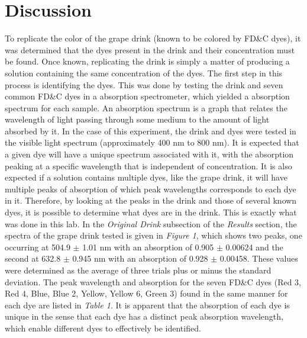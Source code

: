 \documentclass[12pt]{article}
\begin{document}
\section{Discussion}\doublespacing
To replicate the color of the grape drink (known to be colored by FD\&C dyes), it was determined that the dyes present in the drink and their concentration must be found. Once known, replicating the drink is simply a matter of producing a solution containing the same concentration of the dyes. The first step in this process is identifying the dyes. This was done by testing the drink and seven common FD\&C dyes in a absorption spectrometer, which yielded a absorption spectrum for each sample. An absorption spectrum is a graph that relates the wavelength of light passing through some medium to the amount of light absorbed by it. In the case of this experiment, the drink and dyes were tested in the visible light spectrum (approximately 400 nm to 800 nm). It is expected that a given dye will have a unique spectrum associated with it, with the absorption peaking at a specific wavelength that is independent of concentration. It is also expected if a solution contains multiple dyes, like the grape drink, it will have multiple peaks of absorption of which peak wavelengths corresponds to each dye in it. Therefore, by looking at the peaks in the drink and those of several known dyes, it is possible to determine what dyes are in the drink. This is exactly what was done in this lab. In the \textit{Original Drink} subsection of the \textit{Results} section, the spectra of the grape drink tested is given in \textit{Figure 1}, which shows two peaks, one occurring at 504.9 $\pm$ 1.01 nm with an absorption of 0.905 $\pm$ 0.00624 and the second at 632.8 $\pm$ 0.945 nm with an absorption of 0.928 $\pm$ 0.00458. These values were determined as the average of three trials plus or minus the standard deviation. The peak wavelength and absorption for the seven FD\&C dyes (Red 3, Red 4, Blue, Blue 2, Yellow, Yellow 6, Green 3) found in the same manner for each dye are listed in \textit{Table 1}. It is apparent that the absorption of each dye is unique in the sense that each dye has a distinct peak absorption wavelength, which enable different dyes to effectively be identified.\par\vspace{6pt}
%
\end{document}
